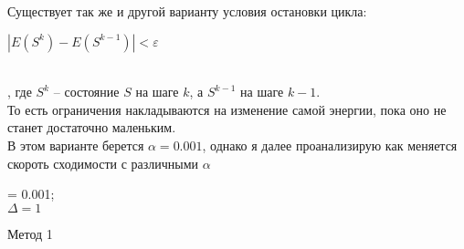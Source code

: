 \documentclass[ 12pt,x11names]{article}
\begin{document}
    Существует так же и другой варианту условия остановки цикла:\\
    \begin{center}
    $ | E(S^k) - E(S^{k-1}) | < \varepsilon$
     \end{center}\\
     , где $S^k$ -- состояние $S$ на шаге $k$, а $S^{k-1}$ на шаге $k-1$.\\
     То есть ограничения накладываются на изменение самой энергии, пока оно не станет достаточно маленьким.\\
    В этом варианте берется $\alpha = 0.001$, однако я далее проанализирую как меняется скороть сходимости  с различными $\alpha$\\
    \begin{algorithm}[H]
		\SetAlgoLined
		\alpha = 0.001;\\
		$ \Delta  = 1$\\
	\caption{Метод 1}
    \end{algorithm}
\end{document}
